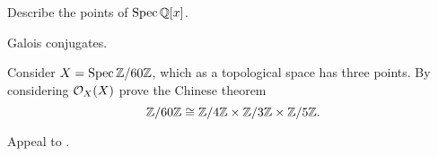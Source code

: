 \section{\problemhead}
\begin{problem}
	Describe the points of $\operatorname{Spec} \mathbb Q[x]$.
	\begin{hint}
		Galois conjugates.
	\end{hint}
\end{problem}

\begin{dproblem}
	Consider $X = \operatorname{Spec} \mathbb Z/60\mathbb Z$, which as a topological space has three points.
	By considering $\mathcal O_X(X)$ prove the Chinese theorem
	\[ \mathbb Z/60\mathbb Z \cong \mathbb Z/4\mathbb Z \times \mathbb Z/3\mathbb Z \times \mathbb Z/5\mathbb Z. \]
	\begin{hint}
		Appeal to .
	\end{hint}
\end{dproblem}

